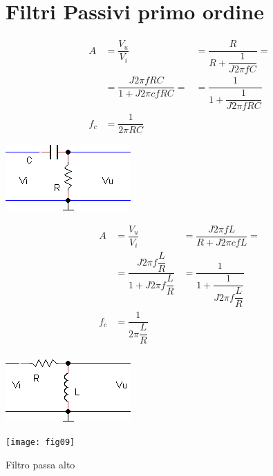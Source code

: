 \chapter{Filtri Passivi primo ordine}
\label{cha:Filtripassiviprimoord}
\minitoc
\mtcskip                                %
\minilof                                %
\mtcskip                                %
\minilot
\begin{table}
\begin{minipage}[t]{0.6\textwidth}
      \centering
       \begin{align*}
A&=\dfrac{V_{u}}{V_{i}}
&=\dfrac{R}{R+\dfrac{1}{J2\pi fC}}=\\
&=\dfrac{J2\pi fRC}{1+J2\pi cfRC}=
&=\dfrac{1}{1+\dfrac{1}{J2\pi fRC}}\\
f_{c}&=\dfrac{1}{2\pi RC}
        \end{align*}
     \end{minipage}\hfill
     \begin{minipage}{0.4\textwidth}
      \centering
       \includegraphics{filtro_PA_CR}
     \end{minipage}
\begin{minipage}[t]{0.4\textwidth}
      \centering
       \begin{align*}
A&=\dfrac{V_{u}}{V_{i}}&=\dfrac{J2\pi fL}{R+J2\pi cfL}=\\
&=\dfrac{J2\pi f\dfrac{L}{R}}{1+J2\pi f\dfrac{L}{R}}
&=\dfrac{1}{1+\dfrac{1}{J2\pi f\dfrac{L}{R}}}\\
f_{c}&=\dfrac{1}{2\pi \dfrac{L}{R}}\\
        \end{align*}
     \end{minipage}\hfill
     \begin{minipage}{0.4\textwidth}
      \centering
       \includegraphics{filtro_PA_RL}
     \end{minipage}
\begin{minipage}{0.4\textwidth}
      \centering
       \texttt{[image: fig09]}
     \end{minipage}
\caption{Filtro passa alto}
\end{table}
